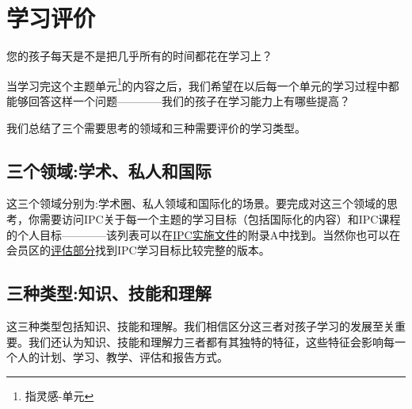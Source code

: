 \chapter{学习评价}
    您的孩子每天是不是把几乎所有的时间都花在学习上？\par
    当学习完这个主题单元\footnote{指灵感-单元}的内容之后，我们希望在以后每一个单元的学习过程中都能够回答这样一个问题————我们的孩子在学习能力上有哪些提高？ \par
    我们总结了三个需要思考的领域和三种需要评价的学习类型。 \par

\section{三个领域:学术、私人和国际}
    这三个领域分别为:学术圈、私人领域和国际化的场景。要完成对这三个领域的思考，你需要访问IPC关于每一个主题的学习目标（包括国际化的内容）和IPC课程的个人目标————该列表可以在\href{https://members.greatlearning.com/ipc/documents?category=31}{IPC实施文件}的附录A中找到。当然你也可以在会员区的\href{https://members.greatlearning.com/ipc/assess/learninggoals}{评估部分}找到IPC学习目标比较完整的版本。


\section{三种类型:知识、技能和理解}
    这三种类型包括知识、技能和理解。我们相信区分这三者对孩子学习的发展至关重要。我们还认为知识、技能和理解力三者都有其独特的特征，这些特征会影响每一个人的计划、学习、教学、评估和报告方式。
    

    
